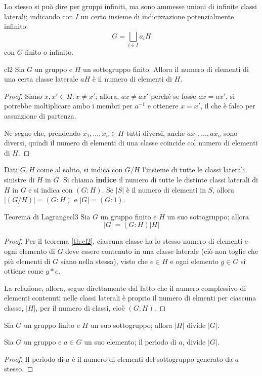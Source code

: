 \documentclass[11pt, a4paper]{scrartcl}
\theoremstyle{definition}
\numberwithin{esempio}{section}
\theoremstyle{definition}
\numberwithin{obs}{section}
\numberwithin{nota}{section}
\numberwithin{equation}{subsection}
\begin{document}
Lo stesso si pu\`o dire per gruppi infiniti, ma sono ammesse unioni di infinite classi laterali; indicando con $I$ un certo insieme di indicizzazione potenzialmente infinito:
\begin{equation}
	G = \bigsqcup _{i \in I} a _i H
\end{equation}
con $G$ finito o infinito.
\begin{teorema}
	{}{cl2}
	Sia $G$ un gruppo e $H$ un sottogruppo finito. Allora il numero di elementi di una certa classe laterale $aH$ \`e il numero di elementi di $H$.
	\begin{proof}
		Siano $x,x' \in H : x\neq x'$; allora, $ax \neq ax'$ perch\'e se fosse $ax=ax'$, si potrebbe moltiplicare ambo i membri per $a^{-1} $ e ottenere $x=x'$, il che \`e falso per assunzione di partenza.

		Ne segue che, prendendo $x_1,\ldots,x_n \in H$ tutti diversi, anche $ax_1, \ldots, ax_n$ sono diversi, quindi il numero di elementi di una classe coincide col numero di elementi di $H$.
	\end{proof}
\end{teorema}
Dati $G,H$ come al solito, si indica con $G/H$ l'insieme di tutte le classi laterali sinistre di $H$ in $G$.
Si chiama \textbf{indice} il numero di tutte le distinte classi laterali di $H$ in $G$ e si indica con $(G:H)$.
Se $|S|$ \`e il numero di elementi in $S$, allora $| (G / H) |= (G:H)$ e $|G| = (G:1)$.
\begin{teorema}
	{Teorema di Lagrange}{cl3}
	Sia $G$ un gruppo finito e $H$ un suo sottogruppo; allora 
	\[
	|G| = (G:H) |H|
	\] 
\begin{proof}
		Per il teorema \ref{th:cl2}, ciascuna classe ha lo stesso numero di elementi e ogni elemento di $G$ deve essere contenuto in una classe laterale (ci\`o non toglie che pi\`u elementi di $G$ siano nella stessa), visto che $e\in H$ e ogni elemento $g \in G$ si ottiene come $g * e$.

		La relazione, allora, segue direttamente dal fatto che il numero complessivo di elementi contenuti nelle classi laterali \`e proprio il numero di elmenti per ciascuna classe, $\lvert H \rvert $, per il numero di classi, cio\`e $\left(G : H\right) $.
\end{proof}	
\end{teorema}
\begin{corollario}
	{}{}
	Sia $G$ un gruppo finito e $H$ un suo sottogruppo; allora $|H|$ divide $|G|$.	
\end{corollario}
\begin{corollario}
	{}{}
	Sia $G$ un gruppo e $a \in G$ un suo elemento; il periodo di $a$, divide $|G|$.
	\begin{proof}
		Il periodo di $a$ \`e il numero di elementi del sottogruppo generato da $a$ stesso.
	\end{proof}
\end{corollario}
\end{document}
